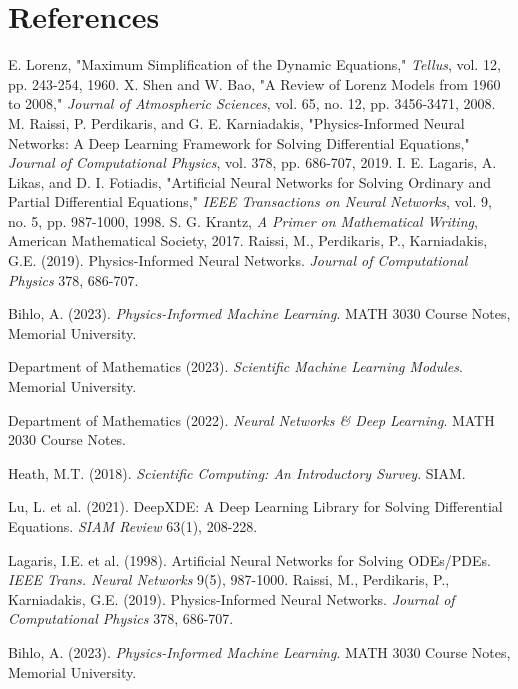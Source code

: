 \documentclass{article}
\begin{document}
\section{References}
\begin{thebibliography}{15}
 E. Lorenz, "Maximum Simplification of the Dynamic Equations," \textit{Tellus}, vol. 12, pp. 243-254, 1960.
 X. Shen and W. Bao, "A Review of Lorenz Models from 1960 to 2008," \textit{Journal of Atmospheric Sciences}, vol. 65, no. 12, pp. 3456-3471, 2008.
 M. Raissi, P. Perdikaris, and G. E. Karniadakis, "Physics-Informed Neural Networks: A Deep Learning Framework for Solving Differential Equations," \textit{Journal of Computational Physics}, vol. 378, pp. 686-707, 2019.
 I. E. Lagaris, A. Likas, and D. I. Fotiadis, "Artificial Neural Networks for Solving Ordinary and Partial Differential Equations," \textit{IEEE Transactions on Neural Networks}, vol. 9, no. 5, pp. 987-1000, 1998.
 S. G. Krantz, \textit{A Primer on Mathematical Writing}, American Mathematical Society, 2017.
 Raissi, M., Perdikaris, P., Karniadakis, G.E. (2019). Physics-Informed Neural Networks. \textit{Journal of Computational Physics} 378, 686-707.

 Bihlo, A. (2023). \textit{Physics-Informed Machine Learning}. MATH 3030 Course Notes, Memorial University.

 Department of Mathematics (2023). \textit{Scientific Machine Learning Modules}. Memorial University.

 Department of Mathematics (2022). \textit{Neural Networks \& Deep Learning}. MATH 2030 Course Notes.

 Heath, M.T. (2018). \textit{Scientific Computing: An Introductory Survey}. SIAM.

 Lu, L. et al. (2021). DeepXDE: A Deep Learning Library for Solving Differential Equations. \textit{SIAM Review} 63(1), 208-228.

 Lagaris, I.E. et al. (1998). Artificial Neural Networks for Solving ODEs/PDEs. \textit{IEEE Trans. Neural Networks} 9(5), 987-1000.
 Raissi, M., Perdikaris, P., Karniadakis, G.E. (2019). Physics-Informed Neural Networks. \textit{Journal of Computational Physics} 378, 686-707.

 Bihlo, A. (2023). \textit{Physics-Informed Machine Learning}. MATH 3030 Course Notes, Memorial University.


\end{thebibliography}
\end{document}
